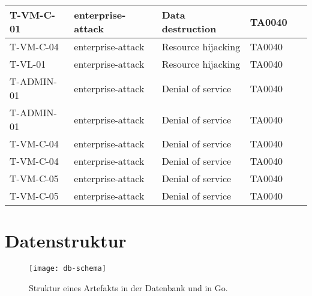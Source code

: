 \begin{table}[!ht]
\begin{longtable}{|l|l|l|l|l|}
        T-VM-C-01 & enterprise-attack & Data destruction & TA0040 & ~ \\ \hline
        T-VM-C-04 & enterprise-attack & Resource hijacking & TA0040 & ~ \\ \hline
        T-VL-01 & enterprise-attack & Resource hijacking & TA0040 & ~ \\ \hline
        T-ADMIN-01 & enterprise-attack & Denial of service & TA0040 & ~ \\ \hline
        T-ADMIN-01 & enterprise-attack & Denial of service & TA0040 & ~ \\ \hline
        T-VM-C-04 & enterprise-attack & Denial of service & TA0040 & ~ \\ \hline
        T-VM-C-04 & enterprise-attack & Denial of service & TA0040 & ~ \\ \hline
        T-VM-C-05 & enterprise-attack & Denial of service & TA0040 & ~ \\ \hline
        T-VM-C-05 & enterprise-attack & Denial of service & TA0040 & ~ \\ \hline
    \end{longtable}
\end{table}

\chapter{Datenstruktur}
\label{app:db-schema}

\begin{figure}
    \centering
    \texttt{[image: db-schema]}
    \caption{Struktur eines Artefakts in der Datenbank und in Go.}
\end{figure}



